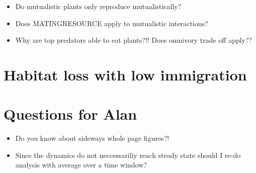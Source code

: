 \begin{itemize}
	\item Do mutualistic plants only reproduce mutualistically?
	\item Does MATINGRESOURCE apply to mutualistic interactions?
	\item Why are top predators able to eat plants?!! Does omnivory trade off apply??
\end{itemize}


\section{Habitat loss with low immigration}

\section{Questions for Alan}

\begin{itemize}
	\item Do you know about sideways whole page figures?!
	\item Since the dynamics do not neccessariliy reach steady state should I re-do analysis with average over a time window?
\end{itemize}
